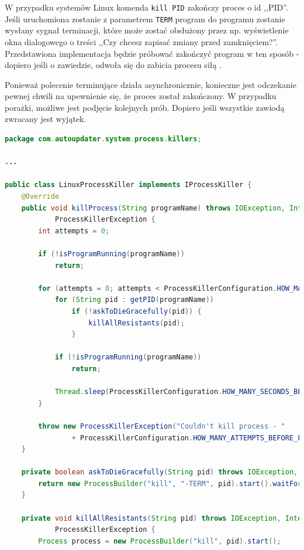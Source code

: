 \documentclass[polish,12pt,titlepage]{article}
\begin{document}
W przypadku systemów Linux komenda \texttt{kill PID} zakończy proces o id
,,PID''. Jeśli uruchomiona zostanie z parametrem \texttt{TERM} program do
programu zostanie wysłany sygnał terminacji, które może zostać obsłużony
przez np. wyświetlenie okna dialogowego o treści ,,Czy chcesz zapisać zmiany
przed zamknięciem?''. Przedstawiona implementacja będzie próbować zakończyć
program w ten sposób - dopiero jeśli o zawiedzie, odwoła się do zabicia
procesu siłą \cite{LINUX_TERMINACJA}.

Ponieważ polecenie terminujące działa asynchronicznie, konieczne jest
odczekanie pewnej chwili na upewnienie się, że proces został zakończony.
W przypadku porażki, możliwe jest podjęcie kolejnych prób. Dopiero jeśli
wszystkie zawiodą zwracany jest wyjątek.

\begin{lstlisting}[language=Java, frame=lines, numberstyle=\tiny, stepnumber=5, caption=Implementacja \texttt{LinuxProcessKiller}., firstnumber=1]
package com.autoupdater.system.process.killers;

...

public class LinuxProcessKiller implements IProcessKiller {
    @Override
    public void killProcess(String programName) throws IOException, InterruptedException,
            ProcessKillerException {
        int attempts = 0;

        if (!isProgramRunning(programName))
            return;

        for (attempts = 0; attempts < ProcessKillerConfiguration.HOW_MANY_ATTEMPTS_BEFORE_FAIL; attempts++) {
            for (String pid : getPID(programName))
                if (!askToDieGracefully(pid)) {
                    killAllResistants(pid);
                }

            if (!isProgramRunning(programName))
                return;

            Thread.sleep(ProcessKillerConfiguration.HOW_MANY_SECONDS_BETWEEN_ATTEMPTS * 1000);
        }

        throw new ProcessKillerException("Couldn't kill process - "
                + ProcessKillerConfiguration.HOW_MANY_ATTEMPTS_BEFORE_FAIL + " attempts failed");
    }

    private boolean askToDieGracefully(String pid) throws IOException, InterruptedException {
        return new ProcessBuilder("kill", "-TERM", pid).start().waitFor() == 0;
    }

    private void killAllResistants(String pid) throws IOException, InterruptedException,
            ProcessKillerException {
        Process process = new ProcessBuilder("kill", pid).start();


\end{lstlisting}
\end{document}
